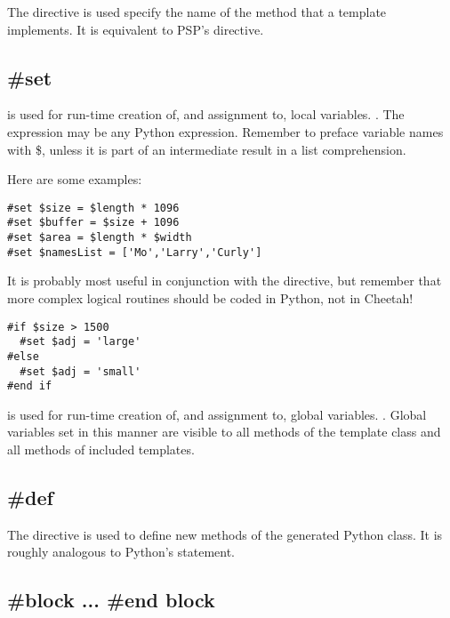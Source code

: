 The  directive is used specify the name of the method that a
template implements.  It is equivalent to PSP's  directive.


\subsection{\#set}
\label{inheritanceEtc.set}

 is used for run-time creation of, and assignment to, local
variables.  . The expression may be any Python
expression. Remember to preface variable names with \$, unless it is part of an
intermediate result in a list comprehension.

Here are some examples:
\begin{verbatim}
#set $size = $length * 1096
#set $buffer = $size + 1096
#set $area = $length * $width
#set $namesList = ['Mo','Larry','Curly']
\end{verbatim}

It is probably most useful in conjunction with the  directive, but
remember that more complex logical routines should be coded in Python, not in
Cheetah!
\begin{verbatim}
#if $size > 1500
  #set $adj = 'large'
#else
  #set $adj = 'small'
#end if
\end{verbatim}

 is used for run-time creation of, and assignment to, global
variables. . Global variables set in this
manner are visible to all methods of the template class and all methods of
included templates.


\subsection{\#def}
\label{inheritanceEtc.def}

The  directive is used to define new methods of the generated Python
class.  It is roughly analogous to Python's  statement.  

\subsection{\#block ... \#end block}
\label{inheritanceEtc.block}


